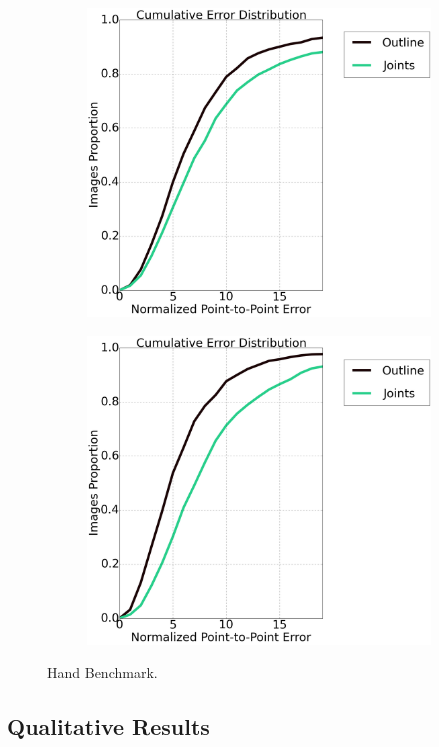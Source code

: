 \begin{figure}[t!]
    \centering
    \begin{subfigure}[b]{0.23\textwidth}
            \includegraphics[width=\textwidth]{resources/HandBenchmark/elbow_joints}
    \end{subfigure}
    \hfill
    \begin{subfigure}[b]{0.23\textwidth}
            \includegraphics[width=\textwidth]{resources/HandBenchmark/wrist_joints}
    \end{subfigure}
    \caption{Hand Benchmark.}
    \label{fig:internal_benchmark}
\end{figure}


\subsection{Qualitative Results}
\label{exp:qualitative}



